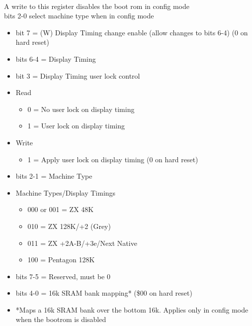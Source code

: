 \\
A write to this register disables the boot rom in config mode\\
bits 2-0 select machine type when in config mode
\begin{itemize}
\item bit 7 = (W) Display Timing change enable (allow changes to
  bits 6-4) (0 on hard reset)
\item bits 6-4 = Display Timing
\item bit 3 = Display Timing user lock control
  \item[] Read
  \begin{itemize}
  \item 0 = No user lock on display timing
  \item 1 = User lock on display timing
  \end{itemize}
  \item[] Write
  \begin{itemize}
  \item 1 = Apply user lock on display timing (0 on hard reset)
  \end{itemize}
\item bits 2-1 = Machine Type
\item[] Machine Types/Display Timings
  \begin{itemize}
  \item 000 or 001 = ZX 48K
  \item 010 = ZX 128K/+2 (Grey)
  \item 011 = ZX +2A-B/+3e/Next Native
  \item 100 = Pentagon 128K
  \end{itemize}
\end{itemize}

\begin{itemize}
\item bits 7-5 = Reserved, must be 0
\item bits 4-0 = 16k SRAM bank mapping* (\$00 on hard reset)
\item[] *Maps a 16k SRAM bank over the bottom 16k. Applies only in
  config mode when the bootrom is disabled
\end{itemize}

